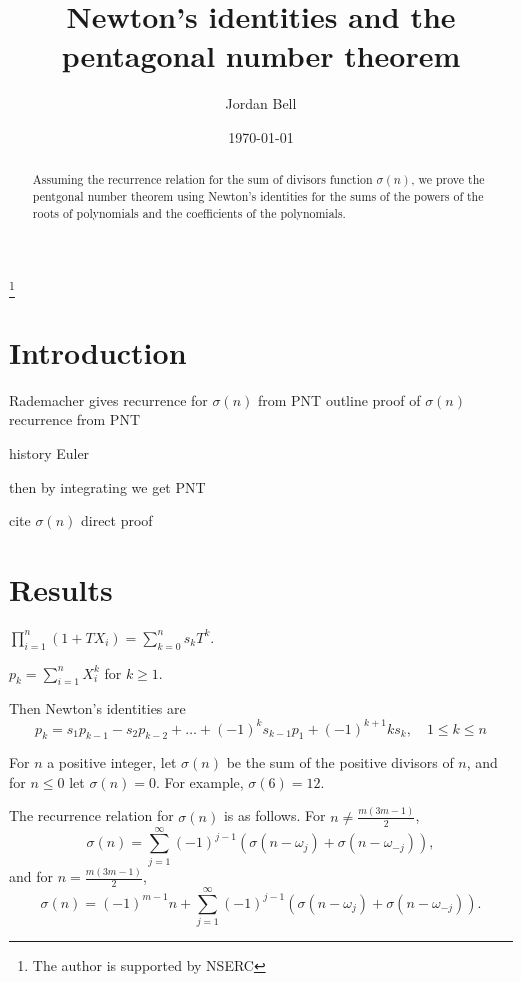 \documentclass{amsart}
\begin{document}
\title{Newton's identities and the pentagonal number theorem}
\author{Jordan Bell}
\thanks{The author is supported by NSERC}
\address{Department of Mathematics, University of Toronto, Toronto, Ontario, Canada}
\date{\today}
\begin{abstract}
Assuming the recurrence relation for the sum of divisors function $\sigma(n)$,
we prove the pentgonal number theorem using Newton's identities for the sums
of the powers of the roots of polynomials and the coefficients of the polynomials.
\end{abstract}
\maketitle

\section{Introduction}

Rademacher \cite{MR0364103} gives recurrence for $\sigma(n)$ from PNT
outline proof of $\sigma(n)$ recurrence from PNT

history Euler \cite{me}


then by integrating we get PNT

cite $\sigma(n)$ direct proof

\section{Results}


$\prod_{i=1}^n (1+TX_i)=\sum_{k=0}^n s_k T^k$.

$p_k=\sum_{i=1}^n X_i^k$ for $k \geq 1$. 

Then Newton's identities \cite[Chap. IV, \S 6, Lemma 4]{bourbaki} are
\[
p_k=s_1p_{k-1}-s_2p_{k-2}+\ldots+(-1)^k s_{k-1}p_1+(-1)^{k+1}ks_k,\quad
1 \leq k \leq n
\] 

For $n$ a positive integer, let $\sigma(n)$ be the sum of the positive divisors
of $n$, and for $n \leq 0$ let $\sigma(n)=0$. For example, $\sigma(6)=12$.

The recurrence relation for $\sigma(n)$ is as follows.
For $n \neq \frac{m(3m-1)}{2}$, 
\begin{equation}
\label{sigma1}
\sigma(n)=\sum_{j=1}^\infty (-1)^{j-1}(\sigma(n-\omega_j)+\sigma(n-\omega_{-j})),
\end{equation}
and for $n=\frac{m(3m-1)}{2}$,
\begin{equation}
\label{sigma2}
\sigma(n)=(-1)^{m-1}n+\sum_{j=1}^\infty (-1)^{j-1}(\sigma(n-\omega_j)+
\sigma(n-\omega_{-j})).
\end{equation}
\end{document}
